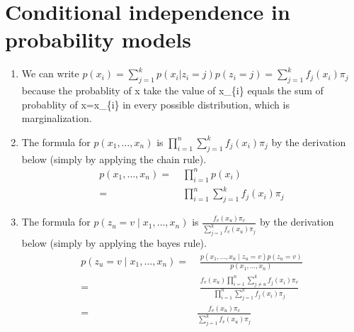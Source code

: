 \section{Conditional independence in probability models}
\begin{enumerate}
\item We can write $p(x_{i})=\sum_{j=1}^{k}p(x_{i}|z_{i}=j)p(z_{i}=j)=\sum_{j=1}^{k}f_{j}(x_{i})\pi_{j}$
because the probablity of x take the value of x\_\{i\} equals the
sum of probablity of x=x\_\{i\} in every possible distribution, which
is marginalization. 

\item The formula for $p(x_{1},\dots,x_{n})$ is $\prod_{i=1}^{n}\sum_{j=1}^{k}f_{j}(x_{i})\pi_{j}$ by the derivation
below (simply by applying the chain rule). \begin{align*}
p(x_{1},\dots,x_{n})= & \;\prod_{i=1}^{n}p(x_{i})\\
= & \;\prod_{i=1}^{n}\sum_{j=1}^{k}f_{j}(x_{i})\pi_{j}\end{align*}

\item The formula for $p(z_{u}=v\mid x_{1},\dots,x_{n})$ is $\frac{f_{v}(x_{u})\pi_{v}}{\sum_{j=1}^{k}f_{v}(x_{u})\pi_{j}}$ by
the derivation below (simply by applying the bayes rule). \begin{align*}
p(z_{u}=v\mid x_{1},\dots,x_{n})= & \;\frac{p(x_{1},\dots,x_{n}\mid z_{u}=v)p(z_{u}=v)}{p(x_{1},\dots,x_{n})}\\
= & \;\frac{f_{v}(x_{u})\prod_{i=1}^{n}\sum_{j\neq u}^{k}f_{j}(x_{i})\pi_{v}}{\prod_{i=1}^{n}\sum_{j=1}^{k}f_{j}(x_{i})\pi_{j}}\\
=\; & \frac{f_{v}(x_{u})\pi_{v}}{\sum_{j=1}^{k}f_{v}(x_{u})\pi_{j}}\end{align*}
 
\end{enumerate}
